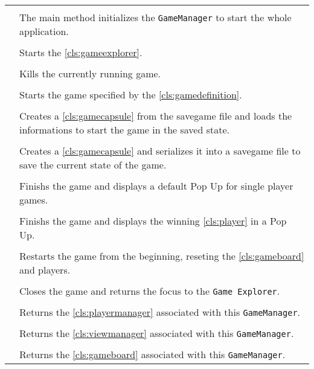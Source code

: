 \paragraph*{}
\begin{longtable}{Lp{10cm}}
	\startmethodtable
	 \\
	& The main method initializes the \texttt{GameManager} to start the whole application. \\
	 \\
	& Starts the \ref{cls:gameexplorer}. \\
	 \\
	& Kills the currently running game. \\
	 \\
	& Starts the game specified by the \ref{cls:gamedefinition}. \\
	 \\
	& Creates a \ref{cls:gamecapsule} from the savegame file and loads the informations to start the game in the saved state. \\
	 \\
	& Creates a \ref{cls:gamecapsule} and serializes it into a savegame file to save the current state of the game. \\
	 \\
	& Finishs the game and displays a default Pop Up for single player games. \\
	 \\
	& Finishs the game and displays the winning \ref{cls:player} in a Pop Up.  \\
	 \\
	& Restarts the game from the beginning, reseting the \ref{cls:gameboard} and players. \\
	 \\
	& Closes the game and returns the focus to the \texttt{Game Explorer}. \\
	 \\
	& Returns the \ref{cls:playermanager} associated with this \texttt{GameManager}.\\
	 \\
	& Returns the \ref{cls:viewmanager} associated with this \texttt{GameManager}.\\
	 \\
	& Returns the \ref{cls:gameboard} associated with this \texttt{GameManager}.\\
	\hline
\end{longtable}

